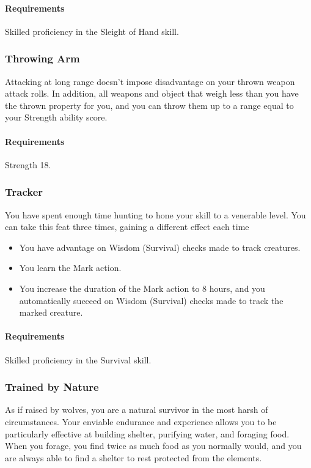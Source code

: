     \paragraph{Requirements} Skilled proficiency in the Sleight of Hand skill.
\subsubsection{Throwing Arm} \label{feat::throwingarm}
    Attacking at long range doesn't impose disadvantage on your thrown weapon attack rolls.
    In addition, all weapons and object that weigh less than you have the thrown property for you, and you can throw them up to a range equal to your Strength ability score.
    \paragraph{Requirements} Strength 18.
\subsubsection{Tracker} \label{feat::tracker}
    You have spent enough time hunting to hone your skill to a venerable level.
    You can take this feat three times, gaining a different effect each time
    \begin{itemize}
        \item You have advantage on Wisdom (Survival) checks made to track creatures.
        \item You learn the Mark action.
        \item You increase the duration of the Mark action to 8 hours, and you automatically succeed on Wisdom (Survival) checks made to track the marked creature.
    \end{itemize}
    \paragraph{Requirements} Skilled proficiency in the Survival skill.
\subsubsection{Trained by Nature} \label{feat::trainedbynature}
    As if raised by wolves, you are a natural survivor in the most harsh of circumstances.
    Your enviable endurance and experience allows you to be particularly effective at building shelter, purifying water, and foraging food.
    When you forage, you find twice as much food as you normally would, and you are always able to find a shelter to rest protected from the elements.
